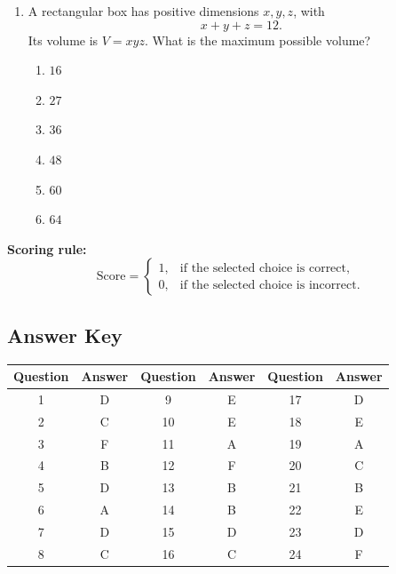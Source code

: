 \documentclass[a4paper,12pt]{article}
\theoremstyle{mystyle}
\numberwithin{equation}{section}
\numberwithin{theorem}{section}
\numberwithin{proposition}{section}
\numberwithin{example}{section}
\numberwithin{remark}{section}
\numberwithin{lemma}{section}
\numberwithin{corollary}{section}
\numberwithin{definition}{section}
\begin{document}
\begin{enumerate}
\item A rectangular box has positive dimensions $x,y,z$, with
\[
    x+y+z=12.
\]
Its volume is $V=xyz$. What is the maximum possible volume?
\begin{enumerate}
    \item $16$
    \item $27$
    \item $36$
    \item $48$
    \item $60$
    \item $64$
\end{enumerate}

\end{enumerate}


\noindent
\textbf{Scoring rule:}
\[
\text{Score}=
\begin{cases}
1, & \text{if the selected choice is correct},\\
0, & \text{if the selected choice is incorrect}.
\end{cases}
\]
\subsection{Answer Key}

\begin{center}
\renewcommand{\arraystretch}{1.3}
\begin{tabular}{|c|c||c|c||c|c|}
\hline
\textbf{Question} & \textbf{Answer} &
\textbf{Question} & \textbf{Answer} &
\textbf{Question} & \textbf{Answer}\\
\hline
1  & D & 9  & E & 17 & D\\
2  & C & 10 & E & 18 & E\\
3  & F & 11 & A & 19 & A\\
4  & B & 12 & F & 20 & C\\
5  & D & 13 & B & 21 & B\\
6  & A & 14 & B & 22 & E\\
7  & D & 15 & D & 23 & D\\
8  & C & 16 & C & 24 & F\\
\hline
\end{tabular}
\end{center}
\printbibliography
\end{document}
